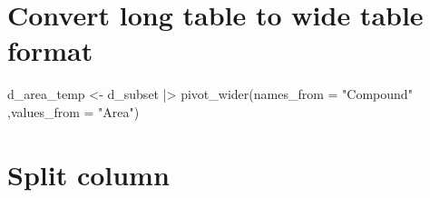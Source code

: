 \documentclass[
  letterpaper,
  DIV=11,
  numbers=noendperiod]{scrreprt}
\newenvironment{Shaded}{\begin{snugshade}}{\end{snugshade}}
\newcommand{\AttributeTok}[1]{\textcolor[rgb]{0.40,0.45,0.13}{#1}}
\newcommand{\FunctionTok}[1]{\textcolor[rgb]{0.28,0.35,0.67}{#1}}
\newcommand{\NormalTok}[1]{\textcolor[rgb]{0.00,0.23,0.31}{#1}}
\newcommand{\OtherTok}[1]{\textcolor[rgb]{0.00,0.23,0.31}{#1}}
\newcommand{\SpecialCharTok}[1]{\textcolor[rgb]{0.37,0.37,0.37}{#1}}
\newcommand{\StringTok}[1]{\textcolor[rgb]{0.13,0.47,0.30}{#1}}
\begin{document}
\hypertarget{convert-long-table-to-wide-table-format}{%
\section{Convert long table to wide table
format}\label{convert-long-table-to-wide-table-format}}

\begin{Shaded}
\begin{Highlighting}[]
\NormalTok{d\_area\_temp }\OtherTok{\textless{}{-}}\NormalTok{ d\_subset }\SpecialCharTok{|\textgreater{}} 
  \FunctionTok{pivot\_wider}\NormalTok{(}\AttributeTok{names\_from =} \StringTok{"Compound"}\NormalTok{ ,}\AttributeTok{values\_from =} \StringTok{"Area"}\NormalTok{)}
\end{Highlighting}
\end{Shaded}

\hypertarget{split-column}{%
\section{Split column}\label{split-column}}
\end{document}
